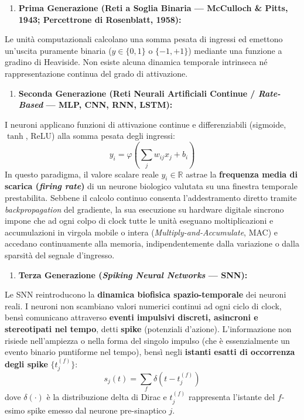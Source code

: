 \documentclass[11pt,a4paper]{article}
\begin{document}
\begin{enumerate}
  \item \textbf{Prima Generazione (Reti a Soglia Binaria --- McCulloch \& Pitts, 1943; Percettrone di Rosenblatt, 1958):}
\end{enumerate}
Le unità computazionali calcolano una somma pesata di ingressi ed emettono un'uscita puramente binaria ($y \in \{0, 1\}$ o $\{-1, +1\}$) mediante una funzione a gradino di Heaviside. Non esiste alcuna dinamica temporale intrinseca né rappresentazione continua del grado di attivazione.
\begin{enumerate}
  \item \textbf{Seconda Generazione (Reti Neurali Artificiali Continue / \textit{Rate-Based} --- MLP, CNN, RNN, LSTM):}
\end{enumerate}
I neuroni applicano funzioni di attivazione continue e differenziabili (sigmoide, $\tanh$, ReLU) alla somma pesata degli ingressi:
\[
y_i = \varphi\left(\sum_{j} w_{ij} x_j + b_i\right)
\]
In questo paradigma, il valore scalare reale $y_i \in \mathbb{R}$ astrae la \textbf{frequenza media di scarica (\textit{firing rate})} di un neurone biologico valutata su una finestra temporale prestabilita. Sebbene il calcolo continuo consenta l'addestramento diretto tramite \textit{backpropagation} del gradiente, la sua esecuzione su hardware digitale sincrono impone che ad ogni colpo di clock tutte le unità eseguano moltiplicazioni e accumulazioni in virgola mobile o intera (\textit{Multiply-and-Accumulate}, MAC) e accedano continuamente alla memoria, indipendentemente dalla variazione o dalla sparsità del segnale d'ingresso.
\begin{enumerate}
  \item \textbf{Terza Generazione (\textit{Spiking Neural Networks} --- SNN):}
\end{enumerate}
Le SNN reintroducono la \textbf{dinamica biofisica spazio-temporale} dei neuroni reali. I neuroni non scambiano valori numerici continui ad ogni ciclo di clock, bensì comunicano attraverso \textbf{eventi impulsivi discreti, asincroni e stereotipati nel tempo}, detti \textbf{spike} (potenziali d'azione). L'informazione non risiede nell'ampiezza o nella forma del singolo impulso (che è essenzialmente un evento binario puntiforme nel tempo), bensì negli \textbf{istanti esatti di occorrenza degli spike} $\{t_j^{(f)}\}$:
\[
s_j(t) = \sum_{f} \delta\left(t - t_j^{(f)}\right)
\]
dove $\delta(\cdot)$ è la distribuzione delta di Dirac e $t_j^{(f)}$ rappresenta l'istante del $f$-esimo spike emesso dal neurone pre-sinaptico $j$.
\end{document}
